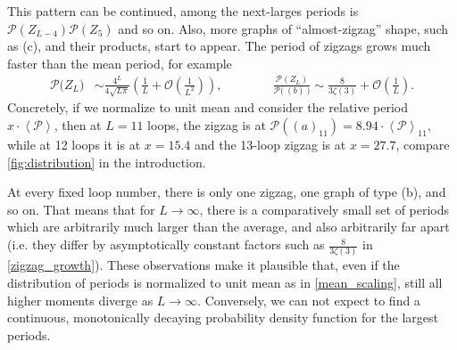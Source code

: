 \documentclass[11pt,a4paper]{article}
\newcommand{\period}{\mathcal P}
\renewcommand{\|}{\rule[-0.4ex]{0.2ex}{1.2em}}
\begin{document}
This pattern can be continued, among the next-larges periods is $\period (Z_{L-4}) \period (Z_5)$ and so on. Also, more graphs of \enquote{almost-zigzag} shape, such as (c), and their products, start to appear. The period of zigzags grows much faster than the mean period, for example
\begin{align}\label{zigzag_growth}
	\period \big( Z_L\big) &\sim \frac{4^L}{4\sqrt{L\pi}}\left( \frac 1 L +  \mathcal{O}\left( \frac 1 {L^2} \right)   \right) , \qquad \qquad 
	\frac{\period (Z_L)}{\period \big(  ~(b)~\big)} \sim \frac{8}{3\zeta(3)}+ \mathcal{O}\left( \frac 1 L \right)  .
\end{align}
Concretely, if we normalize to unit mean and consider the relative period $x \cdot \left \langle \period \right \rangle $, then at $L=11$ loops, the zigzag is at $\period( (a)_{11} )=8.94 \cdot \left \langle \period \right \rangle _{11}$, while at 12 loops it is at $x=15.4$ and the 13-loop zigzag is at $x=27.7$, compare \cref{fig:distribution} in the introduction.

At every fixed loop number, there is only one zigzag, one graph of type (b), and so on. That means that for $L\rightarrow \infty$, there is a comparatively small set of periods which are arbitrarily much larger than the average, and also arbitrarily far apart (i.e. they differ by asymptotically constant factors such as $\frac 8{3\zeta(3)}$ in \cref{zigzag_growth}).
These observations make it plausible that, even if the distribution of periods is normalized to unit mean as in \cref{mean_scaling}, still all higher moments diverge as $L\rightarrow \infty$. Conversely, we can not expect to find a continuous, monotonically decaying probability density function for the largest periods.
\end{document}

